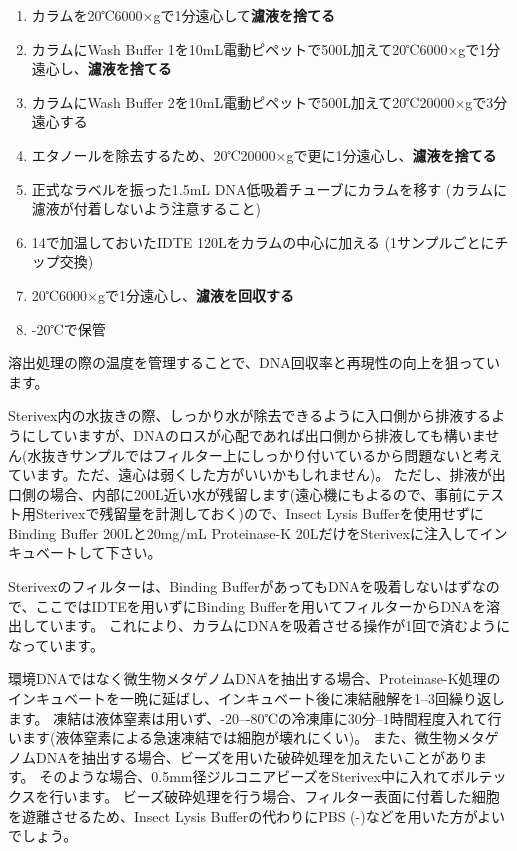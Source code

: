 \documentclass[titlepage,10pt,a4paper,uplatex]{jsbook}
\renewcommand{\textbf}[1]{{\bfseries\sffamily#1}}
\begin{document}
\begin{enumerate}
\item カラムを20℃6000×gで1分遠心して\textbf{濾液を捨てる}
\item カラムにWash Buffer 1を10mL電動ピペットで500{\textmu}L加えて20℃6000×gで1分遠心し、\textbf{濾液を捨てる}
\item カラムにWash Buffer 2を10mL電動ピペットで500{\textmu}L加えて20℃20000×gで3分遠心する
\item エタノールを除去するため、20℃20000×gで更に1分遠心し、\textbf{濾液を捨てる}
\item 正式なラベルを振った1.5mL DNA低吸着チューブにカラムを移す (カラムに濾液が付着しないよう注意すること)
\item 14で加温しておいたIDTE 120{\textmu}Lをカラムの中心に加える (1サンプルごとにチップ交換)
\item 20℃6000×gで1分遠心し、\textbf{濾液を回収する}
\item -20℃で保管
\end{enumerate}

溶出処理の際の温度を管理することで、DNA回収率と再現性の向上を狙っています。

Sterivex内の水抜きの際、しっかり水が除去できるように入口側から排液するようにしていますが、DNAのロスが心配であれば出口側から排液しても構いません(水抜きサンプルではフィルター上にしっかり付いているから問題ないと考えています。ただ、遠心は弱くした方がいいかもしれません)。
ただし、排液が出口側の場合、内部に200{\textmu}L近い水が残留します(遠心機にもよるので、事前にテスト用Sterivexで残留量を計測しておく)ので、Insect Lysis Bufferを使用せずにBinding Buffer 200{\textmu}Lと20mg/mL Proteinase-K 20{\textmu}LだけをSterivexに注入してインキュベートして下さい。

Sterivexのフィルターは、Binding BufferがあってもDNAを吸着しないはずなので、ここではIDTEを用いずにBinding Bufferを用いてフィルターからDNAを溶出しています。
これにより、カラムにDNAを吸着させる操作が1回で済むようになっています。

環境DNAではなく微生物メタゲノムDNAを抽出する場合、Proteinase-K処理のインキュベートを一晩に延ばし、インキュベート後に凍結融解を1--3回繰り返します。
凍結は液体窒素は用いず、{-20}--{-80}℃の冷凍庫に30分--1時間程度入れて行います(液体窒素による急速凍結では細胞が壊れにくい)。
また、微生物メタゲノムDNAを抽出する場合、ビーズを用いた破砕処理を加えたいことがあります。
そのような場合、0.5mm径ジルコニアビーズをSterivex中に入れてボルテックスを行います\citep{Ushio2019}。
ビーズ破砕処理を行う場合、フィルター表面に付着した細胞を遊離させるため、Insect Lysis Bufferの代わりにPBS (-)などを用いた方がよいでしょう。
\end{document}

